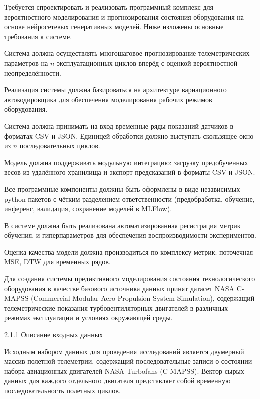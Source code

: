 \documentclass[14pt, a4paper, oneside]{extreport}
\begin{document}
Требуется спроектировать и реализовать программный комплекс для вероятностного моделирования и прогнозирования состояния оборудования на основе нейросетевых генеративных моделей. Ниже изложены основные требования к системе.

Система должна осуществлять многошаговое прогнозирование телеметрических параметров на $n$ эксплуатационных циклов вперёд с оценкой вероятностной неопределённости.

Реализация системы должна базироваться на архитектуре вариационного автокодировщика для обеспечения моделирования рабочих режимов оборудования.

Система должна принимать на вход временные ряды показаний датчиков в форматах CSV и JSON. Единицей обработки должно выступать скользящее окно из $n$ последовательных циклов.

Модель должна поддерживать модульную интеграцию: загрузку предобученных весов из удалённого хранилища и экспорт предсказаний в форматы CSV и JSON.

Все программные компоненты должны быть оформлены в виде независимых python-пакетов с чётким разделением ответственности (предобработка, обучение, инференс, валидация, сохранение моделей в MLFlow).

В системе должна быть реализована автоматизированная регистрация метрик обучения, и гиперпараметров для обеспечения воспроизводимости экспериментов.

Оценка качества модели должна производиться по комплексу метрик: поточечная MSE, DTW для временных рядов.

Для создания системы предиктивного моделирования состояния технологического оборудования в качестве базового источника данных принят датасет NASA C-MAPSS (Commercial Modular Aero-Propulsion System Simulation), содержащий телеметрические показания турбовентиляторных двигателей в различных режимах эксплуатации и условиях окружающей среды.

\vspace{1em}
{2.1.1 Описание входных данных}
\vspace{1em}

Исходным набором данных для проведения исследований является двумерный массив полетной телеметрии, содержащий последовательные записи о состоянии набора авиационных двигателей NASA Turbofans (C-MAPSS). Вектор сырых данных для каждого отдельного двигателя представляет собой временную последовательность полетных циклов.
\end{document}
